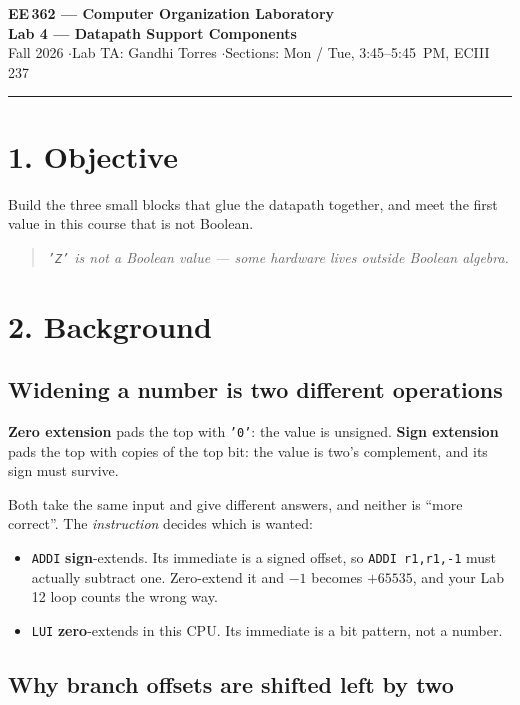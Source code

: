 \documentclass[11pt]{article}
\newcommand{\code}[1]{\texttt{#1}}
\newcommand{\hr}{\vspace{2pt}\hrule\vspace{6pt}}
\begin{document}
\begin{center}
{\Large\bfseries EE\,362 --- Computer Organization Laboratory}\\[2pt]
{\large\bfseries Lab 4 --- Datapath Support Components}\\[4pt]
Fall 2026 \quad$\cdot$\quad Lab TA: Gandhi Torres \quad$\cdot$\quad Sections: Mon / Tue, 3:45--5:45~PM, ECIII 237
\end{center}
\hr

\section*{1. Objective}

Build the three small blocks that glue the datapath together, and meet the first
value in this course that is not Boolean.

\begin{quote}
\emph{\code{'Z'} is not a Boolean value --- some hardware lives outside Boolean
algebra.}
\end{quote}

\section*{2. Background}

\subsection*{Widening a number is two different operations}

\textbf{Zero extension} pads the top with \code{'0'}: the value is unsigned.
\textbf{Sign extension} pads the top with copies of the top bit: the value is
two's complement, and its sign must survive.

Both take the same input and give different answers, and neither is ``more
correct''. The \emph{instruction} decides which is wanted:

\begin{itemize}[leftmargin=1.6em,itemsep=1pt]
\item \code{ADDI} \textbf{sign}-extends. Its immediate is a signed offset, so
\code{ADDI r1,r1,-1} must actually subtract one. Zero-extend it and $-1$ becomes
$+65535$, and your Lab 12 loop counts the wrong way.
\item \code{LUI} \textbf{zero}-extends in this CPU. Its immediate is a bit
pattern, not a number.
\end{itemize}

\subsection*{Why branch offsets are shifted left by two}
\end{document}
